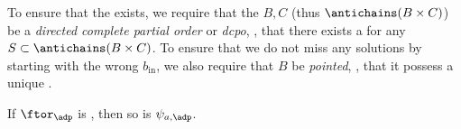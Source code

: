 



To ensure that the  exists, we require that the  $B, C$ (thus $\antichains (B \times C)$) be a \emph{directed complete partial order} or \emph{dcpo}, \ie, that there exists a  for any  $S \subset \antichains (B \times C)$.
To ensure that we do not miss any solutions by starting with the wrong $b_{\text{in}}$, we also require that $B$ be \emph{pointed}, \ie, that it possess a unique .


\begin{lemma}
    If $\ftor_\adp$ is , then so is $\psi_{a,\adp}$.
\end{lemma}

